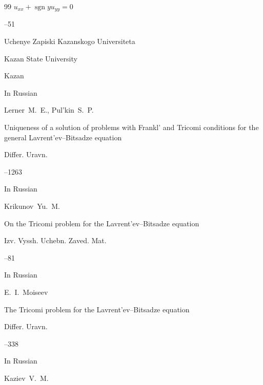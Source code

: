 \begin{thebibliography}{99}
${u_{xx}+\operatorname{sgn}yu_{yy}=0}$




--51

\serial Uchenye Zapiski Kazanskogo Universiteta

\publ Kazan State University

\publaddr Kazan




\lang In Russian

\by Lerner~M.~E., Pul'kin~S.~P.

\paper Uniqueness of a solution of problems with Frankl' and Tricomi conditions for the general Lavrent'ev--Bitsadze equation

\jour Differ. Uravn.




--1263






\lang In Russian

\by Krikunov~Yu.~M.

\paper On the Tricomi problem for the Lavrent'ev--Bitsadze equation

\jour Izv. Vyssh. Uchebn. Zaved. Mat.



--81






\lang In Russian

\by E.~I.~Moiseev

\paper The Tricomi problem for the Lavrent'ev--Bitsadze equation

\jour Differ. Uravn.




--338




\lang In Russian

\by Kaziev~V.~M.


\end{thebibliography}
